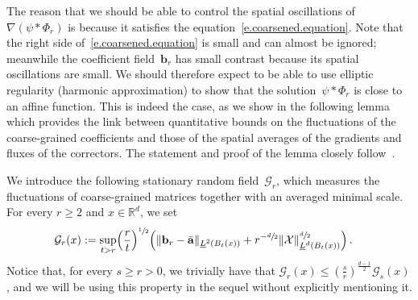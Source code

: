 \documentclass[11pt]{article} %
\numberwithin{equation}{section}
\theoremstyle{definition}
\let\originalleft\left
\let\originalright\right
\renewcommand{\left}{\mathopen{}\mathclose\bgroup\originalleft}
\renewcommand{\right}{\aftergroup\egroup\originalright}
\newcommand*{\R}{\ensuremath{\mathbb{R}}}
\renewcommand{\b}{\ensuremath{\mathbf{b}}}
\renewcommand{\a}{\mathbf{a}}
\newcommand{\ahom}{\bar{\a}}
\newcommand{\X}{\mathcal{X}}
\newcommand{\indc}{1}
\begin{document}
\smallskip

The reason that we should be able to control the spatial oscillations of $\nabla (\psi\ast \Phi_r)$ is because it satisfies the equation~\eqref{e.coarsened.equation}. Note that the right side of~\eqref{e.coarsened.equation} is small and can almost be ignored; meanwhile the coefficient field~$\b_r$ has small contrast because its spatial oscillations are small. We should therefore expect to be able to use elliptic regularity (harmonic approximation) to show that the solution~$\psi\ast \Phi_r$ is close to an affine function. 
This is indeed the case, as we show in the following lemma which provides the  link between quantitative bounds on the fluctuations of the coarse-grained coefficients and those of the spatial averages of the gradients and fluxes of the correctors. The statement and proof of the lemma closely follow~\cite[Lemma 4.15]{AKM}. 

\smallskip

We introduce the following stationary random field~$\mathcal{G}_r$, which measures the fluctuations of coarse-grained matrices together with an averaged minimal scale. 
For every $r \geq 2$ and $x \in \R^d$, we set
\begin{align}  \label{e.uglyG}
\mathcal{G}_r(x) 
& 
: = 
\sup_{t>r} \Bigl(\frac rt \Bigr)^{\sfrac 12} 
\Bigl( 
\| %
\b_r - \ahom \|_{\underline{L}^2 \left( B_{t}(x) \right)} 
+  r^{-\sfrac d2} \left\| \X %
\right\|_{\underline{L}^d \left( B_{t}(x) \right)}^{\sfrac d2}  
 \Bigr)
\,.
\end{align}
Notice that, for every $s \geq r >0$, we trivially have that $\mathcal{G}_r(x) \leq (\frac sr)^{\frac{d-1}{2}} \mathcal{G}_s(x)$, and we will be using this property in the sequel without explicitly mentioning it.
\end{document}
